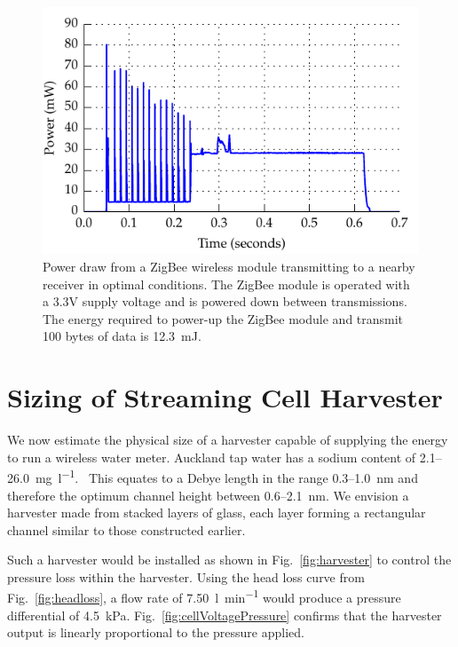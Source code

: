 \documentclass[10pt,final,journal]{IEEEtran}
\begin{document}
    \begin{figure}
        \begin{center}
        \includegraphics[width=\linewidth]{graph_XbeePower_reduced}
        \end{center}
        \caption{Power draw from a ZigBee wireless module transmitting to a nearby receiver in optimal conditions. The ZigBee module is operated with a 3.3V supply voltage and is powered down between transmissions. The energy required to power-up the ZigBee module and transmit 100 bytes of data is \SI{12.3}{\milli\joule}.}
        \label{fig:xbeePower}
    \end{figure}

    \section{Sizing of Streaming Cell Harvester}
    \label{sect:harvesterSize}
    We now estimate the physical size of a harvester capable of supplying the energy to run a wireless water meter.
    Auckland tap water has a sodium content of 2.1--\SI{26.0}{\milli\gram\per\litre}.~\cite{WatercareNewZealand2012}
    This equates to a Debye length in the range 0.3--\SI{1.0}{\nano\metre} and therefore the optimum channel height between 0.6--\SI{2.1}{\nano\metre}.
    We envision a harvester made from stacked layers of glass, each layer forming a rectangular channel similar to those constructed earlier.

    Such a harvester would be installed as shown in Fig.~\ref{fig:harvester} to control the pressure loss within the harvester.
    Using the head loss curve from Fig.~\ref{fig:headloss}, a flow rate of \SI{7.50}{\litre\per\minute} would produce a pressure differential of \SI{4.5}{\kilo\pascal}.
    Fig.~\ref{fig:cellVoltagePressure} confirms that the harvester output is linearly proportional to the pressure applied.
\end{document}
